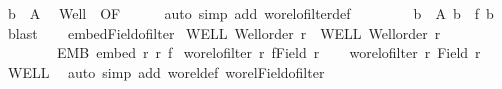 \begin{isabellebody}
\ {\isachardoublequoteopen}b\ {\isasymin}\ A{\isachardoublequoteclose}\ \isamarkupfalse%
\ Well\ {\isacharasterisk}{\kern0pt}\ OF\isanewline
\ \ \ \ \isamarkupfalse%
\ {\isacharparenleft}{\kern0pt}auto\ simp\ add{\isacharcolon}{\kern0pt}\ wo{\isacharunderscore}{\kern0pt}rel{\isachardot}{\kern0pt}ofilter{\isacharunderscore}{\kern0pt}def{\isacharparenright}{\kern0pt}\isanewline
\ \ \ \ \isamarkupfalse%
\ {}\ \isamarkupfalse%
\ {\isachardoublequoteopen}{\isasymexists}b\ {\isasymin}\ A{\isachardot}{\kern0pt}\ b{\isacharprime}{\kern0pt}\ {\isacharequal}{\kern0pt}\ f\ b{\isachardoublequoteclose}\ \isamarkupfalse%
\ blast\isanewline
\ \ \isamarkupfalse%
\isanewline
{}\isamarkupfalse%
%
\endisatagproof
{\isafoldproof}%
%
\isadelimproof
\isanewline
%
\endisadelimproof
\isanewline
{}\isamarkupfalse%
\ embed{\isacharunderscore}{\kern0pt}Field{\isacharunderscore}{\kern0pt}ofilter{\isacharcolon}{\kern0pt}\isanewline
{}\ WELL{\isacharcolon}{\kern0pt}\ {\isachardoublequoteopen}Well{\isacharunderscore}{\kern0pt}order\ r{\isachardoublequoteclose}\ \ WELL{\isacharprime}{\kern0pt}{\isacharcolon}{\kern0pt}\ {\isachardoublequoteopen}Well{\isacharunderscore}{\kern0pt}order\ r{\isacharprime}{\kern0pt}{\isachardoublequoteclose}\ \isanewline
\ \ \ \ \ \ \ \ EMB{\isacharcolon}{\kern0pt}\ {\isachardoublequoteopen}embed\ r\ r{\isacharprime}{\kern0pt}\ f{\isachardoublequoteclose}\isanewline
{}\ {\isachardoublequoteopen}wo{\isacharunderscore}{\kern0pt}rel{\isachardot}{\kern0pt}ofilter\ r{\isacharprime}{\kern0pt}\ {\isacharparenleft}{\kern0pt}f{\isacharbackquote}{\kern0pt}{\isacharparenleft}{\kern0pt}Field\ r{\isacharparenright}{\kern0pt}{\isacharparenright}{\kern0pt}{\isachardoublequoteclose}\isanewline
%
\isadelimproof
%
\endisadelimproof
%
\isatagproof
{}\isamarkupfalse%
{\isacharminus}{\kern0pt}\isanewline
\ \ \isamarkupfalse%
\ {\isachardoublequoteopen}wo{\isacharunderscore}{\kern0pt}rel{\isachardot}{\kern0pt}ofilter\ r\ {\isacharparenleft}{\kern0pt}Field\ r{\isacharparenright}{\kern0pt}{\isachardoublequoteclose}\isanewline
\ \ \isamarkupfalse%
\ WELL\ \isamarkupfalse%
\ {\isacharparenleft}{\kern0pt}auto\ simp\ add{\isacharcolon}{\kern0pt}\ wo{\isacharunderscore}{\kern0pt}rel{\isacharunderscore}{\kern0pt}def\ wo{\isacharunderscore}{\kern0pt}rel{\isachardot}{\kern0pt}Field{\isacharunderscore}{\kern0pt}ofilter{\isacharparenright}{\kern0pt}\isanewline

\end{isabellebody}
